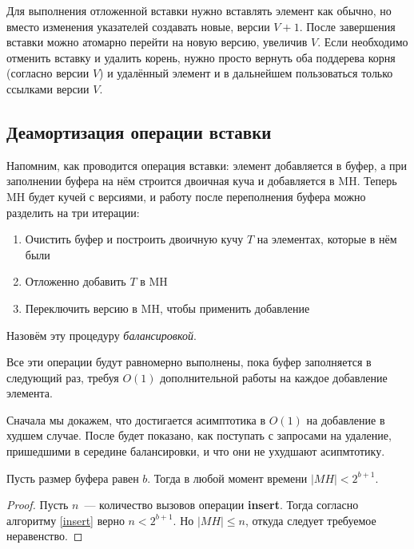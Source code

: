 Для выполнения отложенной вставки нужно вставлять элемент как обычно, но вместо
изменения указателей создавать новые, версии $V+1$. После завершения вставки
можно атомарно перейти на новую версию, увеличив $V$. Если необходимо отменить
вставку и удалить корень, нужно просто вернуть оба поддерева корня (согласно версии
$V$) и удалённый элемент и в дальнейшем пользоваться только ссылками версии $V$.



\subsection{Деамортизация операции вставки}

Напомним, как проводится операция вставки: элемент добавляется в буфер,
а при заполнении буфера на нём строится двоичная куча и добавляется в
MH. Теперь MH будет кучей с версиями, и работу после переполнения буфера
можно разделить на три итерации:
\begin{enumerate}[label=\Roman*.]
\item Очистить буфер и построить двоичную кучу $T$ на элементах, которые в нём были
\item Отложенно добавить $T$ в MH
\item Переключить версию в MH, чтобы применить добавление
\end{enumerate}
Назовём эту процедуру \emph{балансировкой}.

Все эти операции будут равномерно выполнены, пока буфер заполняется в следующий
раз, требуя $O(1)$ дополнительной работы на каждое добавление элемента.

Сначала мы докажем, что достигается асимптотика в $O(1)$ на добавление в худшем
случае. После будет показано, как поступать с запросами на удаление, пришедшими
в середине балансировки, и что они не ухудшают асипмтотику.

\begin{theorem}\label{theo-mh-size}
Пусть размер буфера равен $b$. Тогда в любой момент времени $|MH| < 2^{b+1}$.
\end{theorem}
\begin{proof}
Пусть $n$~--- количество вызовов операции \textbf{insert}. Тогда
согласно алгоритму \ref{insert} верно $n < 2^{b+1}$. Но $|MH| \leq n$, откуда
следует требуемое неравенство.
\end{proof}

